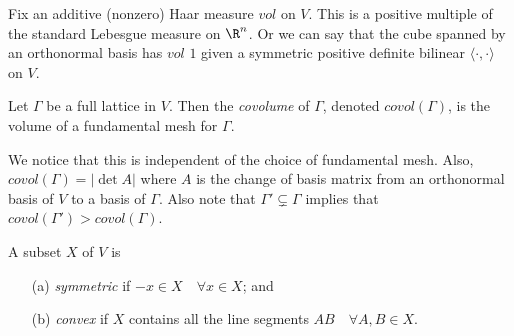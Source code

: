 Fix an additive (nonzero) Haar measure $vol$ on $V$. This is a positive multiple of the standard Lebesgue measure on $\R^n$. Or we can say that the cube spanned by an orthonormal basis has $vol$ $1$ given a symmetric positive definite bilinear $\langle \cdot, \cdot \rangle$ on $V$.

\begin{definition}
    Let $\Gamma$ be a full lattice in $V$. Then the \textit{covolume} of $\Gamma$, denoted $covol(\Gamma)$, is the volume of a fundamental mesh for $\Gamma$. 
\end{definition}

We notice that this is independent of the choice of fundamental mesh. Also, $covol(\Gamma) = |\det A|$ where $A$ is the change of basis matrix from an orthonormal basis of $V$ to a basis of $\Gamma$. Also note that $\Gamma' \subsetneq \Gamma$ implies that $covol(\Gamma')>covol(\Gamma)$.

\begin{definition}
    A subset $X$ of $V$ is
    \begin{itemize}
        \item[(a)] \textit{symmetric} if $-x\in X \quad \forall x \in X$; and
        \item[(b)] \textit{convex} if $X$ contains all the line segments $AB \quad \forall A, B \in X$. 
    \end{itemize}
\end{definition}

